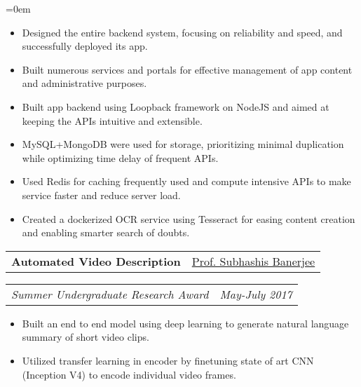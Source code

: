 \documentclass{article}
\makeatletter
\newcommand{\headerrow}[2]
{\begin{tabular*}{\linewidth}{l@{\extracolsep{\fill}}r}
	#1 &
	#2 \\
\end{tabular*}}
\makeatother
\begin{document}
\begin{list} {}{\leftmargin=0em}
\begin{itemize}
    \setlength\itemsep{0.0em}
    \item Designed the entire backend system, focusing on reliability and speed, and successfully deployed its app.
    \item Built numerous services and portals for effective management of app content and administrative purposes.
	\item Built app backend using Loopback framework on NodeJS and aimed at keeping the APIs intuitive and extensible.
	\item MySQL+MongoDB were used for storage, prioritizing minimal duplication while optimizing time delay of frequent APIs.
	\item Used Redis for caching frequently used and compute intensive APIs to make service faster and reduce server load.
    \item Created a dockerized OCR service using Tesseract for easing content creation and enabling smarter search of doubts.
    \end{itemize}
    \item[]
    \headerrow {\textbf{Automated Video Description}}{\underline{Prof. Subhashis Banerjee}}
    \headerrow {\emph{Summer Undergraduate Research Award}}{\emph{May-July 2017}}
    \begin{itemize}
    \setlength\itemsep{0.0em}
        \item Built an end to end model using deep learning to generate natural language summary of short video clips.
        \item Utilized transfer learning in encoder by finetuning state of art CNN (Inception V4) to encode individual video frames.

\end{itemize}
\end{list}
\end{document}
